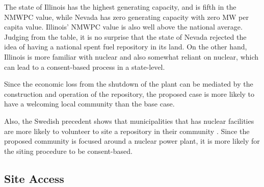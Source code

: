 \begin{table}[h]
	
	\centering
	\caption {\gls{NMWPC} values for different states}

	\end{table}
	
	
The state of Illinois has the highest generating capacity, and is fifth in the \gls{NMWPC}
 value, while Nevada has zero generating capacity with zero MW per capita value. 
Illinois' \gls{NMWPC} value is also well above the national average. Judging from the
table, it is no surprise that the state of Nevada rejected the idea of having a national
spent fuel repository in its land. On the other hand, Illinois is more familiar with 
nuclear and also somewhat reliant on nuclear, which can lead to a consent-based process
in a state-level. 

Since the economic loss from the shutdown of the plant can be mediated by the 
construction and operation of the repository, the proposed case is more likely
to have a welcoming local community than the base case.

Also, the Swedish precedent shows that municipalities that has nuclear facilities
are more likely to volunteer to site a repository in their community
 \cite{Olsson_2013}. Since the proposed community is focused around a nuclear
 power plant, it is more likely for the siting procedure to be consent-based.
 
 

	 
\subsection{Site Access}

